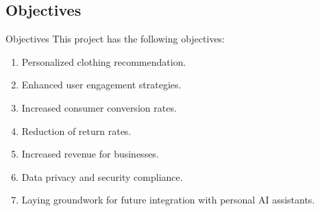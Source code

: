 \subsection{Objectives}
\begin{frame}{Objectives}
	This project has the following objectives:
	\begin{enumerate}
		\item Personalized clothing recommendation.
		\item Enhanced user engagement strategies.
		\item Increased consumer conversion rates.
		\item Reduction of return rates.
		\item Increased revenue for businesses.
		\item Data privacy and security compliance.
		\item Laying groundwork for future integration with personal AI assistants.
	\end{enumerate}
\end{frame}